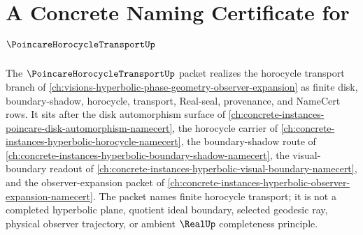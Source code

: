 \chapter{A Concrete Naming Certificate for $\PoincareHorocycleTransportUp$}
\label{ch:concrete-instances-poincare-horocycle-transport-namecert}

The $\PoincareHorocycleTransportUp$ packet realizes the horocycle transport branch of \autoref{ch:visions-hyperbolic-phase-geometry-observer-expansion} as finite disk, boundary-shadow, horocycle, transport, Real-seal, provenance, and NameCert rows. It sits after the disk automorphism surface of \autoref{ch:concrete-instances-poincare-disk-automorphism-namecert}, the horocycle carrier of \autoref{ch:concrete-instances-hyperbolic-horocycle-namecert}, the boundary-shadow route of \autoref{ch:concrete-instances-hyperbolic-boundary-shadow-namecert}, the visual-boundary readout of \autoref{ch:concrete-instances-hyperbolic-visual-boundary-namecert}, and the observer-expansion packet of \autoref{ch:concrete-instances-hyperbolic-observer-expansion-namecert}. The packet names finite horocycle transport; it is not a completed hyperbolic plane, quotient ideal boundary, selected geodesic ray, physical observer trajectory, or ambient $\RealUp$ completeness principle.

